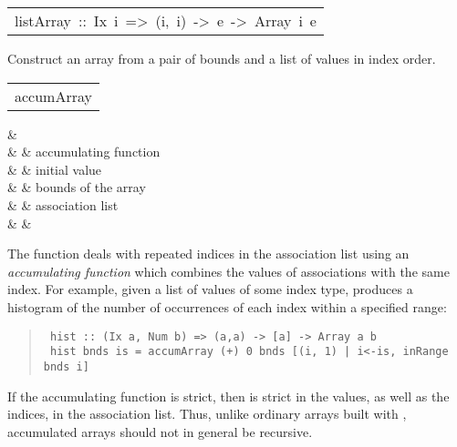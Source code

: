 \begin{haddockdesc}
\item[\begin{tabular}{@{}l}
listArray\ ::\ Ix\ i\ =>\ (i,\ i)\ ->\ {\char 91}e{\char 93}\ ->\ Array\ i\ e
\end{tabular}]\haddockbegindoc
Construct an array from a pair of bounds and a list of values in
 index order.
\par

\end{haddockdesc}
\begin{haddockdesc}
\item[\begin{tabular}{@{}l}
accumArray
\end{tabular}]\haddockbegindoc
\haddockbeginargs
\haddockdecltt{::} &  \\
                     \haddockdecltt{=>} &  & accumulating function
 \\
                                                                      \haddockdecltt{->} &  & initial value
 \\
                                                                                                               \haddockdecltt{->} &  & bounds of the array
 \\
                                                                                                                                                             \haddockdecltt{->} & \haddockdecltt{[(i, a)]} & association list
 \\
                                                                                                                                                                                                             \haddockdecltt{->} &  & \\
\haddockendargs\par
The  function deals with repeated indices in the association
 list using an \emph{accumulating function} which combines the values of
 associations with the same index.
 For example, given a list of values of some index type, 
 produces a histogram of the number of occurrences of each index within
 a specified range:
\par
\begin{quote}
{\haddockverb\begin{verbatim}
 hist :: (Ix a, Num b) => (a,a) -> [a] -> Array a b
 hist bnds is = accumArray (+) 0 bnds [(i, 1) | i<-is, inRange bnds i]
\end{verbatim}}
\end{quote}
If the accumulating function is strict, then  is strict in
 the values, as well as the indices, in the association list.  Thus,
 unlike ordinary arrays built with , accumulated arrays should
 not in general be recursive.
\par

\end{haddockdesc}

